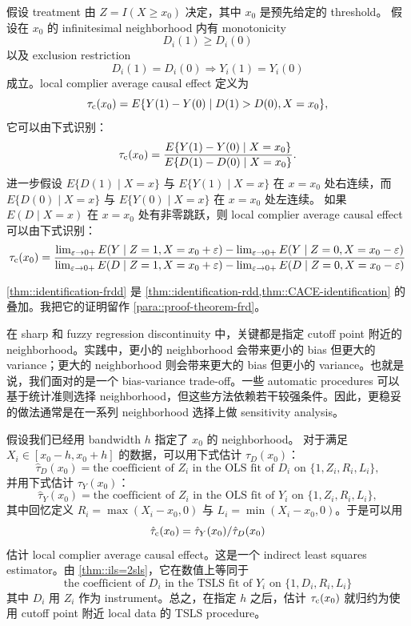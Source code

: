 \begin{theorem}
\label{thm::identification-frdd}
假设 treatment 由 $Z = I(X \geq x_0)$ 决定，其中 $x_0$ 是预先给定的 threshold。
假设在 $x_0$ 的 infinitesimal neighborhood 内有 monotonicity
$$
D_i(1) \geq D_i(0)
$$ 
以及 exclusion restriction
$$
D_i(1) = D_i(0) \Longrightarrow  Y_i(1) = Y_i(0) 
$$
成立。local complier average causal effect 定义为
$$
 \tau_{\textup{c}}(x_0)   
= E\{ Y(1) - Y(0)  \mid D(1)  >  D(0),  X=x_0 \},
$$
它可以由下式识别：
$$
 \tau_{\textup{c}}(x_0)   
=  \frac{ E\{ Y(1) - Y(0)  \mid X=x_0 \}  }{E\{ D(1) - D(0)  \mid X=x_0 \}} .
$$
进一步假设 $E\{ D(1) \mid X=x   \}$ 与 $E\{ Y(1) \mid X=x   \}$ 在 $x=x_0$ 处右连续，而 $E\{ D(0) \mid X=x   \}$ 与 $E\{ Y(0) \mid X=x   \}$ 在 $x=x_0$ 处左连续。
如果 $E(D\mid X=x)$ 在 $x=x_0$ 处有非零跳跃，则 local complier average causal effect 可以由下式识别：
$$
 \tau_{\textup{c}}(x_0) 
 = \frac{ \lim_{\varepsilon \rightarrow 0+} E( Y \mid Z=1, X=x_0+\varepsilon ) - \lim_{\varepsilon \rightarrow 0+} E( Y \mid Z=0, X=x_0-\varepsilon ) }
{\lim_{\varepsilon \rightarrow 0+} E( D \mid Z=1, X=x_0+\varepsilon ) - \lim_{\varepsilon \rightarrow 0+} E( D \mid Z=0, X=x_0-\varepsilon )}
$$
\end{theorem}


 \cref{thm::identification-frdd} 是 \cref{thm::identification-rdd,thm::CACE-identification} 的叠加。我把它的证明留作 \cref{para::proof-theorem-frd}。
 

在 sharp 和 fuzzy regression discontinuity 中，关键都是指定 cutoff point 附近的 neighborhood。实践中，更小的 neighborhood 会带来更小的 bias 但更大的 variance；更大的 neighborhood 则会带来更大的 bias 但更小的 variance。也就是说，我们面对的是一个 bias-variance trade-off。一些 automatic procedures 可以基于统计准则选择 neighborhood，但这些方法依赖若干较强条件。因此，更稳妥的做法通常是在一系列 neighborhood 选择上做 sensitivity analysis。

假设我们已经用 bandwidth $h$ 指定了 $x_0$ 的 neighborhood。
对于满足 $X_i \in [x_0-h, x_0 + h]$ 的数据，可以用下式估计 $\tau_D(x_0)$：
$$
\hat{\tau}_D(x_0) = \text{the coefficient of } Z_i
\text{ in the OLS fit of } D_i \text{ on } \{1, Z_i, R_i, L_i\},
$$
并用下式估计 $\tau_Y(x_0)$：
$$
\hat{\tau}_Y(x_0) = \text{the coefficient of } Z_i
\text{ in the OLS fit of } Y_i \text{ on } \{1, Z_i, R_i, L_i\},
$$
其中回忆定义 $R_i = \max(X_i - x_0, 0)$ 与 $L_i= \min (X_i - x_0, 0)$。于是可以用
$$
\hat\tau_{\textup{c}}(x_0)  = \hat{\tau}_Y(x_0) / \hat{\tau}_D(x_0)
$$ 
估计 local complier average causal effect。这是一个 indirect least squares estimator。由 \cref{thm::ils=2sls}，它在数值上等同于
$$
\text{the coefficient of } D_i
\text{ in the TSLS fit of } Y_i \text{ on } \{1, D_i, R_i, L_i\}  
$$
其中 $D_i$ 用 $Z_i$ 作为 instrument。总之，在指定 $h$ 之后，估计 $ \tau_{\textup{c}}(x_0)$ 就归约为使用 cutoff point 附近 local data 的 TSLS procedure。


